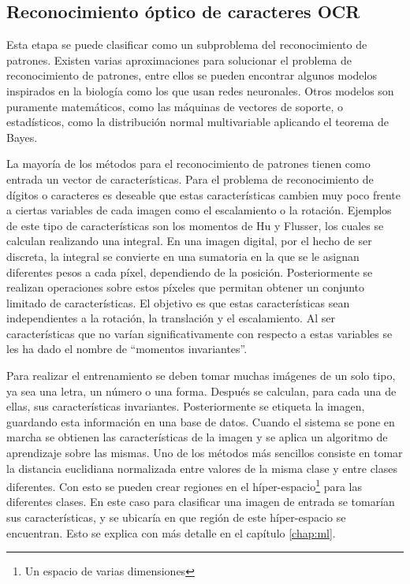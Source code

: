 \documentclass[a4paper, 11pt, oneside]{report}
\begin{document}
\subsection{Reconocimiento óptico de caracteres OCR}

Esta etapa se puede clasificar como un subproblema del reconocimiento de patrones. Existen varias aproximaciones para solucionar el problema de reconocimiento de patrones, entre ellos se pueden encontrar algunos modelos inspirados en la biología como los que usan redes neuronales. Otros modelos son puramente matemáticos, como las máquinas de vectores de soporte, o estadísticos, como la distribución normal multivariable aplicando el teorema de Bayes.

La  mayoría de los métodos para el reconocimiento de patrones tienen como entrada un vector de características. Para el problema de reconocimiento de dígitos o caracteres es deseable que estas características cambien muy poco frente a ciertas variables de cada imagen como el escalamiento o la rotación. Ejemplos de este tipo de características son los momentos de Hu y Flusser, los cuales se calculan realizando una integral. En una imagen digital, por el hecho de ser discreta, la integral se convierte en una sumatoria en la que se le asignan diferentes pesos a cada píxel, dependiendo de la posición. Posteriormente se realizan operaciones sobre estos píxeles que permitan obtener un conjunto limitado de características. El objetivo es que estas características sean independientes a la rotación, la translación y el escalamiento. Al ser características que no varían significativamente con respecto a estas variables se les ha dado el nombre de ``momentos invariantes''.

Para realizar el entrenamiento se deben tomar muchas imágenes de un solo tipo, ya sea una letra, un número o una forma. Después se calculan, para cada una de ellas, sus características invariantes. Posteriormente se etiqueta la imagen, guardando esta información en una base de datos. Cuando el sistema se pone en marcha se obtienen las características de la imagen y se aplica un algoritmo de aprendizaje sobre las mismas. Uno de los métodos más sencillos consiste en tomar la distancia euclidiana normalizada entre valores de la misma clase y entre clases diferentes. Con esto se pueden crear regiones en el híper-espacio\footnote{Un espacio de varias dimensiones} para las diferentes clases. En este caso para clasificar una imagen de entrada se tomarían sus características, y se ubicaría en que región de este híper-espacio se encuentran. Esto se explica con más detalle en el capítulo \ref{chap:ml}.
    
\end{document}

